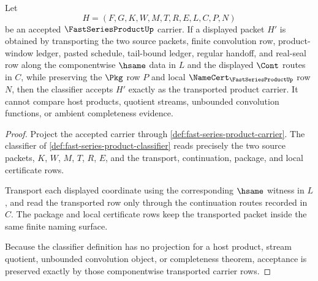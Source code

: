\begin{theorem}
\label{thm:fast-series-product-classifier-transport-exactness}
Let
$$
H=(F,G,K,W,M,T,R,E,L,C,P,N)
$$
be an accepted $\FastSeriesProductUp$ carrier. If a displayed packet $H'$ is obtained by transporting the two source packets, finite convolution row, product-window ledger, pasted schedule, tail-bound ledger, regular handoff, and real-seal row along the componentwise $\hsame$ data in $L$ and the displayed $\Cont$ routes in $C$, while preserving the $\Pkg$ row $P$ and local $\NameCert_{\FastSeriesProductUp}$ row $N$, then the classifier accepts $H'$ exactly as the transported product carrier. It cannot compare host products, quotient streams, unbounded convolution functions, or ambient completeness evidence.
\end{theorem}
\begin{proof}
Project the accepted carrier through \autoref{def:fast-series-product-carrier}. The classifier of \autoref{def:fast-series-product-classifier} reads precisely the two source packets, $K$, $W$, $M$, $T$, $R$, $E$, and the transport, continuation, package, and local certificate rows.

Transport each displayed coordinate using the corresponding $\hsame$ witness in $L$, and read the transported row only through the continuation routes recorded in $C$. The package and local certificate rows keep the transported packet inside the same finite naming surface.

Because the classifier definition has no projection for a host product, stream quotient, unbounded convolution object, or completeness theorem, acceptance is preserved exactly by those componentwise transported carrier rows.
\end{proof}

